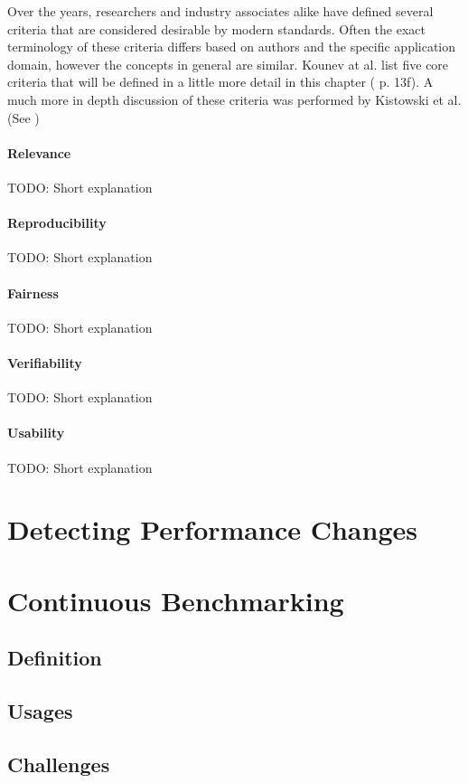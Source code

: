 \documentclass[	runningheads,
				a4paper]{llncs}
\begin{document}
Over the years, researchers and industry associates alike have defined several criteria that are considered desirable by modern standards. Often the exact terminology of these criteria differs based on authors and the specific application domain, however the concepts in general are similar. Kounev at al. list five core criteria that will be defined in a little more detail in this chapter (\cite{Kounev} p. 13f). A much more in depth discussion of these criteria was performed by Kistowski et al. (See \cite{kistowski2015})

\paragraph{Relevance} TODO: Short explanation
\paragraph{Reproducibility} TODO: Short explanation
\paragraph{Fairness} TODO: Short explanation
\paragraph{Verifiability} TODO: Short explanation
\paragraph{Usability} TODO: Short explanation

\section{Detecting Performance Changes}

\section{Continuous Benchmarking}
\subsection{Definition}
\subsection{Usages}
\subsection{Challenges}
\end{document}
